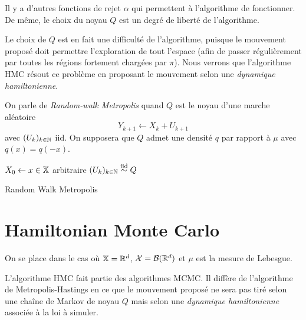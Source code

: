 \documentclass[10pt,a4paper]{article}
\begin{document}
\begin{Rque}
  Il y a d'autres fonctions de rejet $\alpha$ qui permettent à l'algorithme de fonctionner. De même, le choix du noyau $Q$ est un degré de liberté de l'algorithme.

  Le choix de $Q$ est en fait une difficulté de l'algorithme, puisque le mouvement proposé doit permettre l'exploration de tout l'espace (afin de passer régulièrement par toutes les régions fortement chargées par $\pi$). Nous verrons que l'algorithme HMC résout ce problème en proposant le mouvement selon une \emph{dynamique hamiltonienne}.
\end{Rque}

\begin{Def}
  On parle de \emph{Random-walk Metropolis} quand $Q$ est le noyau d'une marche aléatoire
  $$Y_{k+1} \leftarrow X_k + U_{k+1}$$
  avec $(U_k)_{k \in \mathbb{N}}$ iid. On supposera que $Q$ admet une densité $q$ par rapport à $\mu$ avec $q(x) = q(-x)$.
\end{Def}

\begin{center}
\begin{algorithm}[H]
  $X_0 \leftarrow x \in \mathbb{X}$ arbitraire\;
  $(U_k)_{k \in \mathbb{N}} \stackrel{\rm iid}{\sim} Q$ \;
  \caption{Random Walk Metropolis}
  \label{algo:metropolis}
\end{algorithm}
\end{center}

\section{Hamiltonian Monte Carlo}

On se place dans le cas où $\mathbb{X} = \mathbb{R}^d$, $\mathcal{X} = \mathcal{B}(\mathbb{R}^d)$ et $\mu$ est la mesure de Lebesgue. 

L'algorithme HMC fait partie des algorithmes MCMC. Il diffère de l'algorithme de Metropolis-Hastings en ce que le mouvement proposé ne sera pas tiré selon une chaîne de Markov de noyau $Q$ mais selon une \emph{dynamique hamiltonienne} associée à la loi à simuler.
\end{document}
